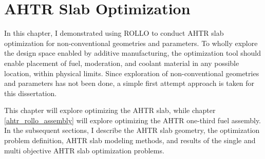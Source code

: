 \chapter{AHTR Slab Optimization}
In this chapter, I demonstrated using \gls{ROLLO} to conduct \gls{AHTR} slab 
optimization for non-conventional geometries and parameters.
To wholly explore the design space enabled by additive manufacturing, the 
optimization tool should enable placement of fuel, moderation, and coolant material 
in any possible location, within physical limits. 
Since exploration of non-conventional geometries and parameters has not been done, 
a simple first attempt approach is taken for this dissertation. 

This chapter will explore optimizing the AHTR slab, while chapter 
\ref{ahtr_rollo_assembly} will explore optimizing the AHTR one-third fuel assembly.
In the subsequent sections, I describe the AHTR slab geometry, the optimization 
problem definition, AHTR slab modeling methods, and results of the 
single and multi objective \gls{AHTR} slab optimization problems.


